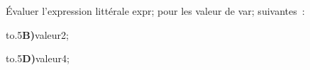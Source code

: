 \documentclass[exercice]{thedocument}%
\begin{document}
%
Évaluer l'expression littérale \<expr; pour les valeur de \<var; suivantes~:\par\medskip\noindent
\hbox{\hbox to.5\hbox{{\bfseries B)\quad}\<valeur2;}}\par
\hbox{\hbox to.5\hbox{{\bfseries D)\quad}\<valeur4;}}
\end{document}
